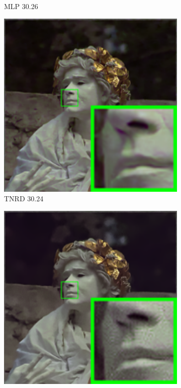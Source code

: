 \begin{figure}
\begin{subfigure}[t]{0.19\textwidth}
\caption{MLP 30.26}
    \end{subfigure}
    \hfill
    \begin{subfigure}[t]{0.19\textwidth}
        \centering
        \includegraphics[width=1\textwidth]{images/mcwnnm/24images/resize_br_TNRD_nSig301050_kodim17.png}
\caption{TNRD 30.24}
    \end{subfigure}
    \hfill
    \begin{subfigure}[t]{0.19\textwidth}
        \centering
        \includegraphics[width=1\textwidth]{images/mcwnnm/24images/resize_br_NC_nSig301050_kodim17.png}

\end{subfigure}
\end{figure}
